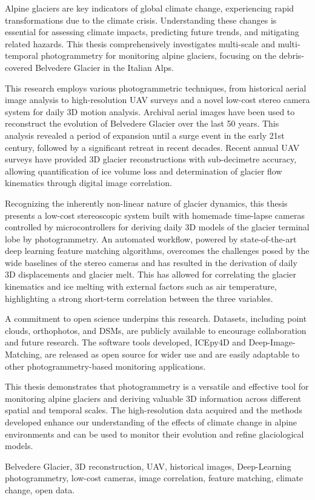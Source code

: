 Alpine glaciers are key indicators of global climate change, experiencing rapid transformations due to the climate crisis. 
Understanding these changes is essential for assessing climate impacts, predicting future trends, and mitigating related hazards.
This thesis comprehensively investigates multi-scale and multi-temporal photogrammetry for monitoring alpine glaciers, focusing on the debris-covered Belvedere Glacier in the Italian Alps.

This research employs various photogrammetric techniques, from historical aerial image analysis to high-resolution UAV surveys and a novel low-cost stereo camera system for daily 3D motion analysis.
Archival aerial images have been used to reconstruct the evolution of Belvedere Glacier over the last 50 years. 
This analysis revealed a period of expansion until a surge event in the early 21st century, followed by a significant retreat in recent decades.
Recent annual UAV surveys have provided 3D glacier reconstructions with sub-decimetre accuracy, allowing quantification of ice volume loss and determination of glacier flow kinematics through digital image correlation.

Recognizing the inherently non-linear nature of glacier dynamics, this thesis presents a low-cost stereoscopic system built with homemade time-lapse cameras controlled by microcontrollers for deriving daily 3D models of the glacier terminal lobe by photogrammetry.
An automated workflow, powered by state-of-the-art deep learning feature matching algorithms, overcomes the challenges posed by the wide baselines of the stereo cameras and has resulted in the derivation of daily 3D displacements and glacier melt.
This has allowed for correlating the glacier kinematics and ice melting with external factors such as air temperature, highlighting a strong short-term correlation between the three variables. 

A commitment to open science underpins this research. 
Datasets, including point clouds, orthophotos, and DSMs, are publicly available to encourage collaboration and future research. 
The software tools developed, ICEpy4D and Deep-Image-Matching, are released as open source for wider use and are easily adaptable to other photogrammetry-based monitoring applications.

This thesis demonstrates that photogrammetry is a versatile and effective tool for monitoring alpine glaciers and deriving valuable 3D information across different spatial and temporal scales. 
The high-resolution data acquired and the methods developed enhance our understanding of the effects of climate change in alpine environments and can be used to monitor their evolution and refine glaciological models.

\vspace{5pt}
 Belvedere Glacier, 3D reconstruction, UAV, historical images, Deep-Learning photogrammetry, low-cost cameras, image correlation, feature matching, climate change, open data.